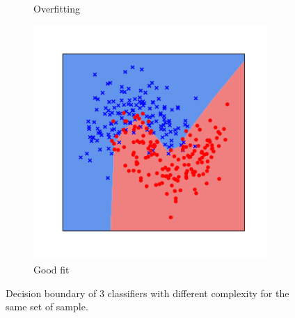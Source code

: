 \begin{figure}[t]
\begin{subfigure}[b]{0.32\textwidth}
    \caption{Overfitting}
    \label{figure:ch2-fitting_points_b}
  \end{subfigure}
  \hfill
  \begin{subfigure}[b]{0.32\textwidth}
    \includegraphics[width=0.98\textwidth]{figures/main/ch2-background/normal.pdf}
    \caption{Good fit}
    \label{figure:ch2-fitting_points_c}
  \end{subfigure}
  \caption{
    Decision boundary of 3 classifiers with different complexity for the same set of sample.
  }
  \label{figure:ch2-fitting_points}
\end{figure}


